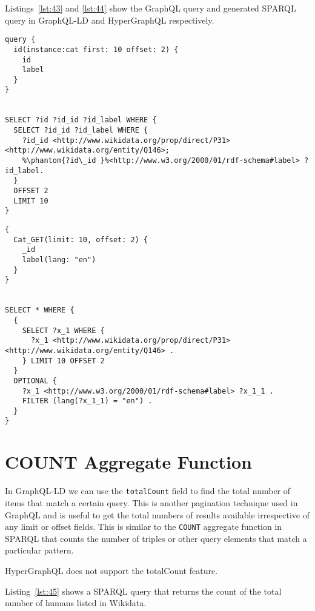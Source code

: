 Listings~\ref{lst:43} and \ref{lst:44} show the GraphQL query and generated SPARQL query in GraphQL-LD and HyperGraphQL respectively.


\begin{minipage}{\linewidth}
\begin{lstlisting}[columns=fullflexible, label=lst:43, caption={GraphQL query and generated SPARQL query in GraphQL-LD}, language=SPARQL]
query {
  id(instance:cat first: 10 offset: 2) {
    id
    label
  }
}


SELECT ?id ?id_id ?id_label WHERE {
  SELECT ?id_id ?id_label WHERE {
    ?id_id <http://www.wikidata.org/prop/direct/P31> <http://www.wikidata.org/entity/Q146>;
    %\phantom{?id\_id }%<http://www.w3.org/2000/01/rdf-schema#label> ?id_label.
  }
  OFFSET 2
  LIMIT 10
}
\end{lstlisting}
\end{minipage}


\begin{minipage}{\linewidth}
\begin{lstlisting}[columns=fullflexible, label=lst:44, caption={GraphQL query and generated SPARQL query in HyperGraphQL}, language=SPARQL]
{
  Cat_GET(limit: 10, offset: 2) {
    _id
    label(lang: "en")
  }
}


SELECT * WHERE {
  {
    SELECT ?x_1 WHERE {
      ?x_1 <http://www.wikidata.org/prop/direct/P31> <http://www.wikidata.org/entity/Q146> .
    } LIMIT 10 OFFSET 2
  }
  OPTIONAL {
    ?x_1 <http://www.w3.org/2000/01/rdf-schema#label> ?x_1_1 .
    FILTER (lang(?x_1_1) = "en") .
  }
}
\end{lstlisting}
\end{minipage}


\section{COUNT Aggregate Function}

In GraphQL-LD we can use the \texttt{totalCount} field to find the total number of items that match a certain query. This is another pagination technique used in GraphQL and is useful to get the total numbers of results available irrespective of any limit or offset fields. This is similar to the \texttt{COUNT} aggregate function in SPARQL that counts the number of triples or other query elements that match a particular pattern. 

HyperGraphQL does not support the totalCount feature.

Listing~\ref{lst:45} shows a SPARQL query that returns the count of the total number of humans listed in Wikidata.


